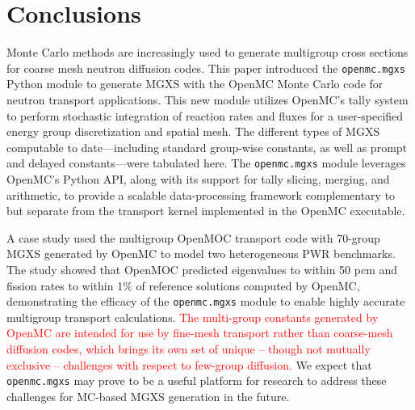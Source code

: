 \section{Conclusions}
\label{sec:conclusions}

Monte Carlo methods are increasingly used to generate multigroup cross sections for coarse mesh neutron diffusion codes. This paper introduced the \texttt{openmc.mgxs} Python module to generate MGXS with the OpenMC Monte Carlo code for neutron transport applications. This new module utilizes OpenMC's tally system to perform stochastic integration of reaction rates and fluxes for a user-specified energy group discretization and spatial mesh. The different types of MGXS computable to date---including standard group-wise constants, as well as prompt and delayed constants---were tabulated here. The \texttt{openmc.mgxs} module leverages OpenMC's Python API, along with its support for tally slicing, merging, and arithmetic, to provide a scalable data-processing framework complementary to but separate from the transport kernel implemented in the OpenMC executable.

A case study used the multigroup OpenMOC transport code with 70-group MGXS generated by OpenMC to model two heterogeneous PWR benchmarks. The study showed that OpenMOC predicted eigenvalues to within 50 pcm and fission rates to within 1\% of reference solutions computed by OpenMC, demonstrating the efficacy of the \texttt{openmc.mgxs} module to enable highly accurate multigroup transport calculations. \textcolor{red}{The multi-group constants generated by OpenMC are intended for use by fine-mesh transport rather than coarse-mesh diffusion codes, which brings its own set of unique -- though not mutually exclusive -- challenges with respect to few-group diffusion.} We expect that \texttt{openmc.mgxs} may prove to be a useful platform for research to address these challenges for MC-based MGXS generation in the future.

